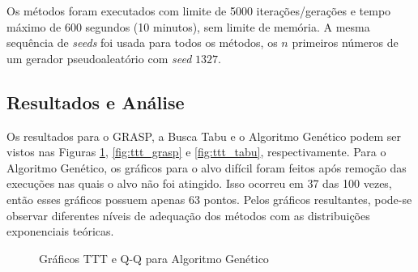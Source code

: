 \documentclass{MO824}
\begin{document}
    Os métodos foram executados com limite de 5000 iterações/gerações e tempo máximo de 600 segundos (10 minutos), sem limite de memória. A mesma sequência de \textit{seeds} foi usada para todos os métodos, os $n$ primeiros números de um gerador pseudoaleatório com \textit{seed} $1327$.
    
\subsection{Resultados e Análise}
Os resultados para o GRASP, a Busca Tabu e o Algoritmo Genético podem ser vistos nas Figuras \ref{fig:ttt_ga}, \ref{fig:ttt_grasp} e \ref{fig:ttt_tabu}, respectivamente. Para o Algoritmo Genético, os gráficos para o alvo difícil foram feitos após remoção das execuções nas quais o alvo não foi atingido. Isso ocorreu em 37 das 100 vezes, então esses gráficos possuem apenas 63 pontos. Pelos gráficos resultantes, pode-se observar diferentes níveis de adequação dos métodos com as distribuições exponenciais teóricas. 

\begin{figure}
    \centering
    \caption{Gráficos TTT e Q-Q para Algoritmo Genético}
    \label{fig:ttt_ga}
\end{figure}
\end{document}

